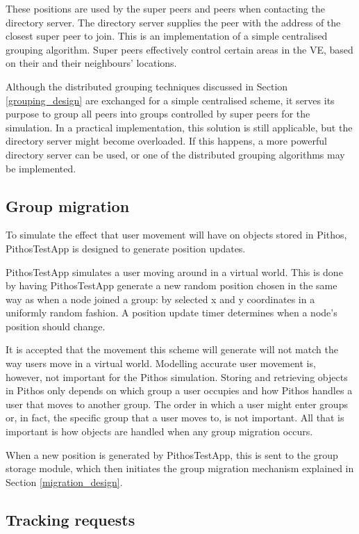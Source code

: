 These positions are used by the super peers and peers when contacting the directory server. The directory server supplies the peer with the address of the closest super peer to join. This is an implementation of a simple centralised grouping algorithm. Super peers effectively control certain areas in the VE, based on their and their neighbours' locations.

Although the distributed grouping techniques discussed in Section \ref{grouping_design} are exchanged for a simple centralised scheme, it serves its purpose to group all peers into groups controlled by super peers for the simulation. In a practical implementation, this solution is still applicable, but the directory server might become overloaded. If this happens, a more powerful directory server can be used, or one of the distributed grouping algorithms may be implemented.

\subsection{Group migration}
\label{group_migration_implementation}

To simulate the effect that user movement will have on objects stored in Pithos, PithosTestApp is designed to generate position updates.

PithosTestApp simulates a user moving around in a virtual world. This is done by having PithosTestApp generate a new random position chosen in the same way as when a node joined a group: by selected x and y coordinates in a uniformly random fashion. A position update timer determines when a node's position should change.

It is accepted that the movement this scheme will generate will not match the way users move in a virtual world. Modelling accurate user movement is, however, not important for the Pithos simulation. Storing and retrieving objects in Pithos only depends on which group a user occupies and how Pithos handles a user that moves to another group. The order in which a user might enter groups or, in fact, the specific group that a user moves to, is not important. All that is important is how objects are handled when any group migration occurs.

When a new position is generated by PithosTestApp, this is sent to the group storage module, which then initiates the group migration mechanism explained in Section \ref{migration_design}.

\subsection{Tracking requests}
\label{pending_rpcs_implementation}

